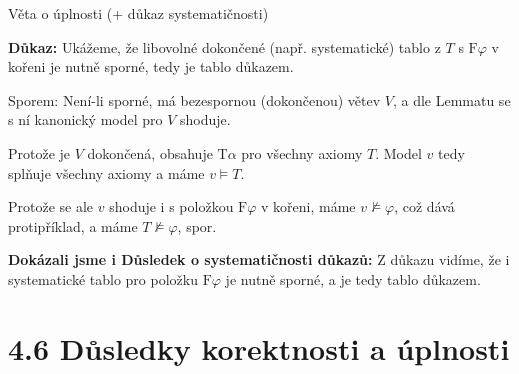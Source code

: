 \documentclass{beamer}
\begin{document}
\begin{frame}{Věta o úplnosti (+ důkaz systematičnosti)}

    
    \textbf{Důkaz:}
    Ukážeme, že libovolné dokončené (např. \alert{systematické}) tablo z $T$ s $\mathrm{F}\varphi$ v kořeni je nutně sporné, tedy je tablo důkazem. 
    
    Sporem: \alert{Není-li sporné}, má bezespornou (dokončenou) větev $V$, a dle Lemmatu se s ní kanonický model pro $V$ shoduje. 
    
    Protože je $V$ dokončená, obsahuje $\mathrm{T}\alpha$ pro všechny axiomy $T$. Model $v$ tedy splňuje všechny axiomy a máme $v\models T$. 
    
    Protože se ale $v$ shoduje i s položkou $\mathrm{F}\varphi$ v kořeni, máme $v\not\models\varphi$, což dává protipříklad, a máme $T\not\models\varphi$, spor.\hfill\qedsymbol


    \textbf{Dokázali jsme i Důsledek o systematičnosti důkazů:}  Z důkazu vidíme, že i systematické tablo pro položku $\mathrm{F}\varphi$ je nutně sporné, a je tedy tablo důkazem.\hfill\qedsymbol

\end{frame}


\section{4.6 Důsledky korektnosti a úplnosti}
\end{document}
